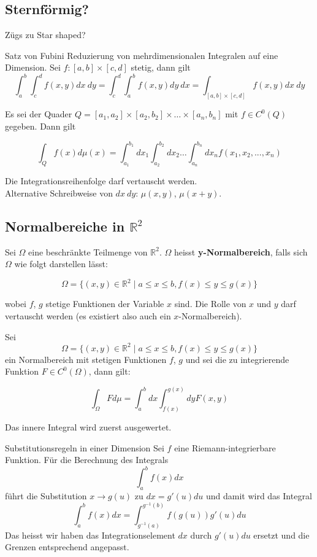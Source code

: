 \subsection{Sternförmig?}
Zügs zu Star shaped?



\begin{Satz}{Satz von Fubini}{}
    Reduzierung von mehrdimensionalen Integralen auf eine Dimension. Sei $f: [a,b] \times [c, d]$ stetig, dann gilt
    \[ \int_a^b \int_c^d f(x, y) dx ~ dy = \int_c^d \int_a^b f(x, y) dy ~ dx = \int_{[a,b] \times [c, d]} f(x, y) dx ~ dy   \]

    Es sei der Quader $Q = [a_1,a_2] \times [a_2, b_2] \times \dots \times [a_n, b_n]$ mit $f \in C^0(Q)$ gegeben. Dann gilt

    \[
        \int_Q f(x) d\mu(x) = \int_{a_1}^{b_1} dx_1 \int_{a_2}^{b_2} dx_2 \dots \int_{a_n}^{b_n} dx_n f(x_1, x_2,...,x_n)
    \]
\end{Satz}
Die Integrationsreihenfolge darf vertauscht werden.\\

Alternative Schreibweise von $dx ~ dy$: $\mu(x, y)$, $\mu(x+y)$.

\subsection{Normalbereiche in $\mathbb{R}^2$}

Sei $\Omega$ eine beschränkte Teilmenge von $\mathbb{R}^2$. $\Omega$ heisst \textbf{y-Normalbereich}, falls sich $\Omega$ wie folgt darstellen lässt:

\[
    \Omega = \{(x, y) \in \mathbb{R}^2 \mid a \leq x \leq b, f(x) \leq y \leq g(x)\}
\]

wobei $f$, $g$ stetige Funktionen der Variable $x$ sind. Die Rolle von $x$ und $y$ darf vertauscht werden (es existiert also auch ein $x$-Normalbereich).

Sei \[\Omega = \{(x, y) \in \mathbb{R}^2 \mid a \leq x \leq b, f(x) \leq y \leq g(x)\}\] ein Normalbereich mit stetigen Funktionen $f$, $g$ und sei die zu integrierende Funktion $F \in C^0(\Omega)$, dann gilt:

\[
    \int_{\Omega} F d\mu = \int_a^b dx \int_{f(x)}^{g(x)} dy F(x, y)
\]

Das innere Integral wird zuerst ausgewertet.

\begin{Satz}{Substitutionsregeln in einer Dimension}{}
    Sei $f$ eine Riemann-integrierbare Funktion. Für die Berechnung des Integrals
    \[
        \int_a^b f(x) dx
    \]
    führt die Substitution $x \to g(u)$ zu $dx = g'(u)du$ und damit wird das Integral
    \[
        \int_a^b f(x) dx = \int_{g^{-1}(a)}^{g^{-1}(b)} f(g(u)) g'(u) du
    \]
    Das heisst wir haben das Integrationselement $dx$ durch $g'(u)du$ ersetzt und die Grenzen entsprechend angepasst.
\end{Satz}

